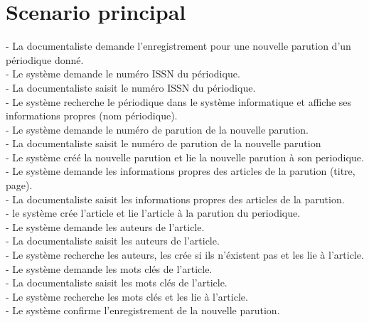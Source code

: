 \documentclass[a4paper,10pt]{report}
\begin{document}
\section*{Scenario principal}
\begin{flushleft}
- La documentaliste demande l'enregistrement pour une nouvelle parution d'un périodique donné.\\
- Le système demande le numéro ISSN du périodique.\\
- La documentaliste saisit le numéro ISSN du périodique.\\
- Le système recherche le périodique dans le système informatique et affiche ses informations propres (nom périodique).\\
- Le système demande le numéro de parution de la nouvelle parution.\\
- La documentaliste saisit le numéro de parution de la nouvelle parution\\
- Le système créé la nouvelle parution et lie la nouvelle parution à son periodique.\\
- Le système demande les informations propres des articles de la parution (titre, page).\\
- La documentaliste saisit les informations propres des articles de la parution.\\
- le système crée l'article et lie l'article à la parution du periodique.\\
- Le système demande les auteurs de l'article.\\
- La documentaliste saisit les auteurs de l'article.\\
- Le système recherche les auteurs, les crée si ils n'éxistent pas et les lie à l'article.\\
- Le système demande les mots clés de l'article.\\
- La documentaliste saisit les mots clés de l'article.\\
- Le système recherche les mots clés et les lie à l'article.\\
- Le système confirme l'enregistrement de la nouvelle parution.\\
\end{flushleft}

\bigskip
\end{document}
